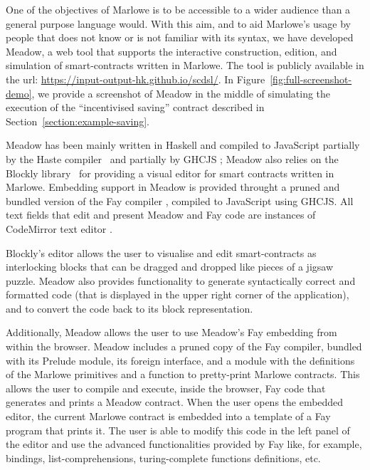 \documentclass[runningheads]{llncs}
\begin{document}
\label{section:tool}

One of the objectives of Marlowe is to be accessible to a wider audience
than a general purpose language would. With this aim, and to aid Marlowe's
usage by people that does not know or is not familiar with its syntax,
we have developed Meadow, a web tool that supports the interactive construction,
edition, and simulation of smart-contracts written in Marlowe. The
tool is publicly available in the url: \url{https://input-output-hk.github.io/scdsl/}.
In Figure~\ref{fig:full-screenshot-demo}, we provide a screenshot
of Meadow in the middle of simulating the execution of the ``incentivised
saving'' contract described in Section~\ref{section:example-saving}.

Meadow has been mainly written in Haskell and compiled to JavaScript
partially by the Haste compiler~\cite{Haste} and partially by GHCJS \cite{GHCJS};
Meadow also relies on the Blockly library~\cite{Blockly} for providing a visual
editor for smart contracts written in Marlowe. Embedding support in Meadow
is provided throught a pruned and bundled version of the Fay compiler \cite{Fay},
compiled to JavaScript using GHCJS. All text fields that edit and present Meadow and Fay code are
instances of CodeMirror text editor \cite{CodeMirror}.

Blockly's editor allows the user to visualise and edit
smart-contracts as interlocking blocks that can be dragged and dropped
like pieces of a jigsaw puzzle. %
Meadow also provides functionality to generate syntactically correct
and formatted code (that is displayed in the upper right corner of the application),
and to convert the code back to its block representation.

Additionally, Meadow allows the user to use Meadow's Fay embedding from within the browser. %
Meadow includes a pruned copy of the Fay compiler, bundled with its Prelude module, 
its foreign interface, and a module with the definitions of the Marlowe primitives and a function to pretty-print 
Marlowe contracts. This allows the user to compile and execute, inside the browser, Fay
code that generates and prints a Meadow contract. When the user opens the embedded editor, the current Marlowe contract 
is embedded into a template of a Fay program that prints it. The user is able to modify this code in the left 
panel of the editor and use the advanced functionalities provided by Fay like, for example, bindings, 
list-comprehensions, turing-complete functions definitions, etc.
\end{document}
